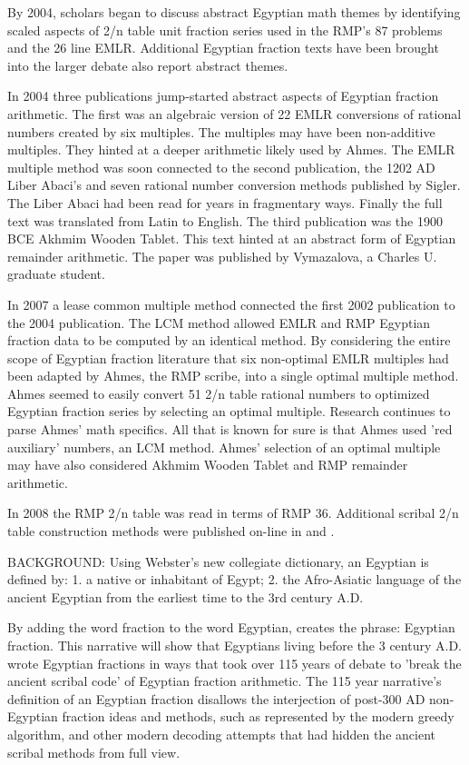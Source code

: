\documentclass[12pt]{article}
\begin{document}
By 2004, scholars began to discuss abstract Egyptian math themes by identifying scaled aspects of 2/n table unit fraction series used in the RMP's 87 problems and the 26 line EMLR. Additional Egyptian fraction texts have been brought into the larger debate also report abstract themes. 

In 2004 three publications jump-started abstract aspects of Egyptian fraction arithmetic. The first was an algebraic version of 22 EMLR conversions of rational numbers created by six multiples. The multiples may have been non-additive multiples. They hinted at a deeper arithmetic likely used by Ahmes. The EMLR multiple method was soon connected to the second publication, the 1202 AD Liber Abaci's and seven rational number conversion methods published by Sigler. The Liber Abaci had been read for years in fragmentary ways. Finally the full text was translated from Latin to English. The third publication was the 1900 BCE Akhmim Wooden Tablet. This text hinted at an abstract form of Egyptian remainder arithmetic. The paper was published by Vymazalova, a Charles U. graduate student.

In 2007 a lease common multiple method connected the first 2002 publication to the 2004 publication. The LCM method allowed EMLR and RMP Egyptian fraction data to be computed by an identical method. By considering the entire scope of Egyptian fraction literature that six non-optimal EMLR multiples had been adapted by Ahmes, the RMP scribe, into a single optimal multiple method. Ahmes seemed to easily convert 51 2/n table rational numbers to optimized Egyptian fraction series by selecting an optimal multiple. Research continues to parse Ahmes' math specifics. All that is known for sure is that Ahmes used 'red auxiliary' numbers, an LCM method. Ahmes' selection of an optimal multiple may have also considered Akhmim Wooden Tablet and RMP remainder arithmetic.

In 2008 the RMP 2/n table was read in terms of RMP 36. Additional scribal 2/n table construction methods were published on-line in  and . 

BACKGROUND: Using Webster's new collegiate dictionary, an Egyptian is defined by: 1. a native or inhabitant of Egypt; 2. the Afro-Asiatic  language of the ancient Egyptian from the earliest time to the 3rd century A.D. 

By adding the word fraction to the word Egyptian, creates the phrase: Egyptian fraction. This narrative will show that Egyptians living before the 3 century A.D. wrote Egyptian fractions in ways that took over 115 years of debate to 'break the ancient scribal code' of Egyptian fraction arithmetic. The 115 year narrative's definition of an Egyptian fraction disallows the interjection of post-300 AD non-Egyptian fraction ideas and methods, such as represented by the modern greedy algorithm, and other modern decoding attempts that had hidden the ancient scribal methods from full view. 
\end{document}
